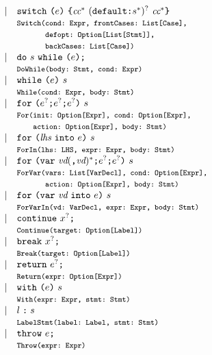 \[
\begin{array}{llll}
& \mid &  {\tt switch} \ \verb+(+\expr\verb+)+ \ \verb+{+\cc^* \ ({\tt default} \verb+:+ \stmt^{*})^? \ \cc^* \verb+}+\\
&& \mtt{Switch(cond:~Expr, frontCases:~List[Case],}\\
&&\mtt{\phantom{Switch(}defopt:~Option[List[Stmt]],}\\
&&\mtt{\phantom{Switch(}backCases:~List[Case])}\\
& \mid & {\tt do} \ \stmt \ {\tt while} \ \verb+(+\expr\verb+)+ \verb+;+ \\
&& \mtt{DoWhile(body:~Stmt, cond:~Expr)}\\
  &\mid& {\tt while} \ \verb+(+\expr\verb+)+ \ \stmt \\
&& \mtt{While(cond:~Expr, body:~Stmt)}\\
  &\mid& {\tt for} \ \verb+(+\expr^?\verb+;+ \expr^?\verb+;+ \expr^? \verb+)+ \ \stmt\\
&& \mtt{For(init:~Option[Expr], cond:~Option[Expr],}\\
&&\mtt{\phantom{For(}action:~Option[Expr], body:~Stmt)}\\
  &\mid& {\tt for} \ \verb+(+ \lhs \ {\tt into} \ \expr \verb+)+ \ \stmt \\
&&\mtt{ForIn(lhs:~LHS, expr:~Expr, body:~Stmt)}\\
  &\mid& {\tt for} \ \verb+(+{\tt var} \ \vd(\verb+,+ \vd)^*\verb+;+ \expr^?\verb+;+ \expr^?\verb+)+ \ \stmt\\
&& \mtt{ForVar(vars:~List[VarDecl], cond:~Option[Expr],}\\
&&\mtt{\phantom{ForVar(}action:~Option[Expr], body:~Stmt)}\\
&\mid& {\tt for} \ \verb+(+{\tt var} \ \vd \ {\tt into} \ \expr \verb+)+ \ \stmt \\
&& \mtt{ForVarIn(vd:~VarDecl, expr:~Expr, body:~Stmt)}\\
& \mid & {\tt continue} \  \myid^{?} \verb+;+ \\
&& \mtt{Continue(target:~Option[Label])}\\
& \mid & {\tt break} \  \myid^{?} \verb+;+ \\
&& \mtt{Break(target:~Option[Label])}\\
& \mid & {\tt return} \ \expr^? \verb+;+ \\
&& \mtt{Return(expr:~Option[Expr])}\\
& \mid & {\tt with} \ \verb+(+\expr\verb+)+ \ \stmt \\
&& \mtt{With(expr:~Expr, stmt:~Stmt)}\\
& \mid & l \; \verb+:+ \; \stmt \\
&& \mtt{LabelStmt(label:~Label, stmt:~Stmt)}\\
& \mid & {\tt throw} \ \expr \verb+;+ \\
&& \mtt{Throw(expr:~Expr)}\\


\end{array}\]
